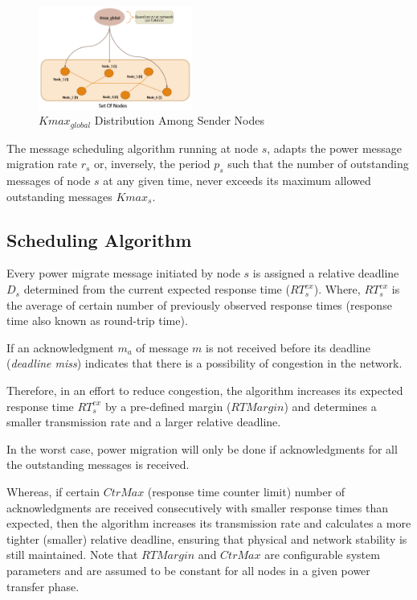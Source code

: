 \begin{figure}[htb]
  \begin{center}
    \includegraphics[width=0.45\textwidth]{Figures/kmax_distri.png}
  \caption{$Kmax_{global}$ Distribution Among Sender Nodes}
  \label{fig:Kmax_distribution}
  \end{center}
\end{figure}

The message scheduling algorithm running at node $s$, adapts the power message migration 
rate $r_s$ or, inversely, the period $p_s$ such that the number of outstanding messages
of node $s$ at any given time, never exceeds its maximum allowed outstanding messages $Kmax_s$.


\subsection{Scheduling Algorithm}
\label{sec:sched_algo_explanation} 


Every power migrate message initiated by node $s$ is assigned a relative deadline $D_s$ determined 
from the current expected response time ($RT_s^{ex}$). Where, $RT_s^{ex}$ is the average of certain number 
of previously observed response times (response time also known as round-trip time). 

If an acknowledgment $m_a$ of message $m$ is not received before its deadline (\textit{deadline miss}) 
indicates that there is a possibility of congestion in the network. 

Therefore, in an effort to reduce congestion, the algorithm increases its expected response time $RT_s^{ex}$
by a pre-defined margin ($RTMargin$) and determines a smaller transmission rate and a larger relative deadline.

In the worst case, power migration will only be done if acknowledgments for all the outstanding messages is received. 

Whereas, if certain $CtrMax$ (response time counter limit) number of acknowledgments are received 
consecutively with smaller response times than expected, then the algorithm increases its transmission rate 
and calculates a more tighter (smaller) relative deadline, ensuring that physical and network stability is 
still maintained. Note that $RTMargin$ and $CtrMax$ are configurable system parameters and are assumed to 
be constant for all nodes in a given power transfer phase. 


